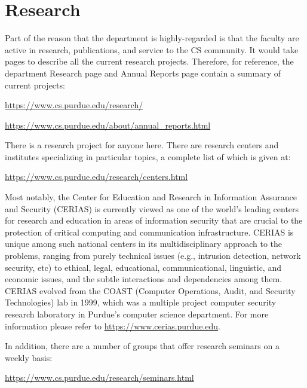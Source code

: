 \section{Research}

Part of the reason that the department is highly-regarded is that the faculty are active in research, publications, and service to the CS community. It would take pages to describe all the current research projects. Therefore, for reference, the department Research page and Annual Reports page contain a summary of current projects:

\centerline{\url{https://www.cs.purdue.edu/research/}}
\vspace{\baselineskip}
\centerline{\url{https://www.cs.purdue.edu/about/annual_reports.html}}
\vspace{\baselineskip}

There is a research project for anyone here. There are research centers and institutes specializing in particular topics, a complete list of which is given at:

\centerline{\url{https://www.cs.purdue.edu/research/centers.html}}
\vspace{\baselineskip}

Most notably, the Center for Education and Research in Information Assurance and Security (CERIAS) is currently viewed as one of the world's leading centers for research and education in areas of information security that are crucial to the protection of critical computing and communication infrastructure. CERIAS is unique among such national centers in its multidisciplinary approach to the problems, ranging from purely technical issues (e.g., intrusion detection, network security, etc) to ethical, legal, educational, communicational, linguistic, and economic issues, and the subtle interactions and dependencies among them. CERIAS evolved from the COAST (Computer Operations, Audit, and Security Technologies) lab in 1999, which was a multiple project computer security research laboratory in Purdue's computer science department. For more information please refer to \url{https://www.cerias.purdue.edu}.

In addition, there are a number of groups that offer research seminars on a weekly basis:

\centerline{\url{https://www.cs.purdue.edu/research/seminars.html}}
\vspace{\baselineskip}
